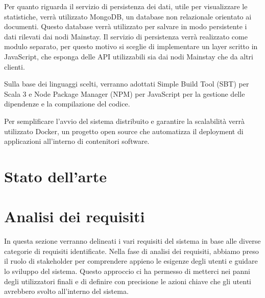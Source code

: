\documentclass[12pt]{article}
\begin{document}
Per quanto riguarda il servizio di persistenza dei dati, utile per visualizzare le statistiche, verrà utilizzato MongoDB, un database non relazionale orientato ai documenti. Questo database verrà utilizzato per salvare in modo persistente i dati rilevati dai nodi Mainstay.
Il servizio di persistenza verrà realizzato come modulo separato, per questo motivo si sceglie di implementare un layer scritto in JavaScript, che esponga delle API utilizzabili sia dai nodi Mainstay che da altri clienti.

Sulla base dei linguaggi scelti, verranno adottati Simple Build Tool (SBT) per Scala 3 e Node Package Manager (NPM) per JavaScript per la gestione delle dipendenze e la compilazione del codice.

Per semplificare l'avvio del sistema distribuito e garantire la scalabilità verrà utilizzato Docker, un progetto open source che automatizza il deployment di applicazioni all'interno di contenitori software.

\newpage


\section{Stato dell'arte}



\newpage



\section{Analisi dei requisiti}
In questa sezione verranno delineati i vari requisiti del sistema in base alle diverse categorie di requisiti identificate. Nella fase di analisi dei requisiti, abbiamo preso il ruolo di stakeholder per comprendere appieno le esigenze degli utenti e guidare lo sviluppo del sistema. Questo approccio ci ha permesso di metterci nei panni degli utilizzatori finali e di definire con precisione le azioni chiave che gli utenti avrebbero svolto all'interno del sistema.
\end{document}
